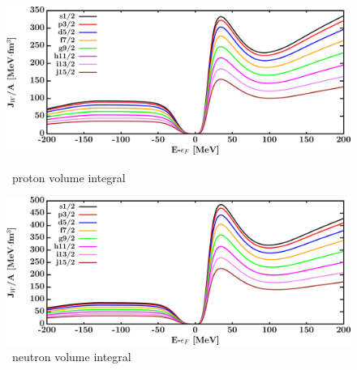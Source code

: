 \begin{figure}[hbtp]
    \centering
    \begin{minipage}{0.42\textwidth}
        \centering
        \includegraphics[width=\textwidth]{figures/o18_protonVolumeIntegrals.png}
        \caption*{\oEight\ proton volume integral}
        \label{DOMFitData_o18_proton_potentialIntegral}
    \end{minipage}\hspace{6pt}
    \begin{minipage}{0.42\textwidth}
        \centering
        \includegraphics[width=\textwidth]{figures/o18_neutronVolumeIntegrals.png}
        \caption*{\oEight\ neutron volume integral}
        \label{DOMFitData_o18_neutron_potentialIntegral}
    \end{minipage}
\end{figure}
